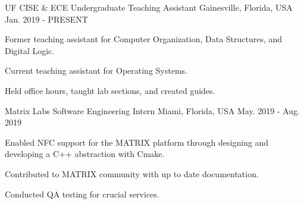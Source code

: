 
\begin{cventries}

  \cventry
    {UF CISE \& ECE} %
    {Undergraduate Teaching Assistant} %
    {Gainesville, Florida, USA} %
    {Jan. 2019 - PRESENT} %
    {
      \begin{cvitems} %
        \item {Former teaching assistant for Computer Organization, Data Structures, and Digital Logic.}
        \item {Current teaching assistant for Operating Systems.}
        \item {Held office hours, taught lab sections, and created guides.}
      \end{cvitems}
    }


  \cventry
    {Matrix Labs} %
    {Software Engineering Intern} %
    {Miami, Florida, USA} %
    {May. 2019 - Aug. 2019} %
    {
      \begin{cvitems} %
        \item {Enabled NFC support for the MATRIX platform through designing and developing a C++ abstraction with Cmake.}
        \item {Contributed to MATRIX community with up to date documentation.}
        \item {Conducted QA testing for crucial services.}
      \end{cvitems}
    }



\end{cventries}
